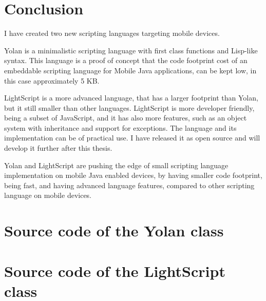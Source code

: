 \documentclass[11pt]{report}
\begin{document}
\chapter{Conclusion}
\label{conclusion}
I have created two new scripting languages targeting mobile devices.

Yolan is a minimalistic scripting language with first class functions and Lisp-like syntax. This language is a proof of concept that the code footprint cost of an embeddable scripting language for Mobile Java applications, can be kept low, in this case approximately 5 KB.

LightScript is a more advanced language, that has a larger footprint than Yolan, but it still smaller than other languages. LightScript is more developer friendly, being a subset of JavaScript, and it has also more features, such as an object system with inheritance and support for exceptions.
The language and its implementation can be of practical use. I have released it as open source and will develop it further after this thesis.

Yolan and LightScript are pushing the edge of small scripting language implementation on mobile Java enabled devices, by having smaller code footprint, being fast, and having advanced language features, compared to other scripting language on mobile devices.


%
%

\newpage
{}



\appendix

%

\chapter{Source code of the Yolan class}


\chapter{Source code of the LightScript class}



\newpage
{}
\printindex
\end{document}
